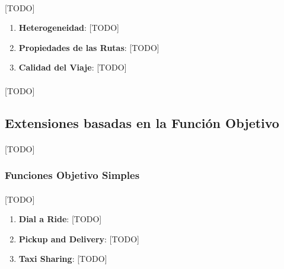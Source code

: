 \documentclass{subfiles}
\begin{document}
        \paragraph{}
        [TODO]

        \begin{enumerate}
          \item \textbf{Heterogeneidad}: [TODO]

          \item \textbf{Propiedades de las Rutas}: [TODO]

          \item \textbf{Calidad del Viaje}: [TODO]

        \end{enumerate}

        \paragraph{}
        [TODO]

      \subsection{Extensiones basadas en la Función Objetivo}
      \label{sec:formulation_extensions_objective_functions}

        \paragraph{}
        [TODO]

        \subsubsection{Funciones Objetivo Simples}
        \label{sec:formulation_extensions_objective_functions_single}

          \paragraph{}
          [TODO]

          \begin{enumerate}

            \item \textbf{Dial a Ride}: [TODO]

            \item \textbf{Pickup and Delivery}: [TODO]

            \item \textbf{Taxi Sharing}: [TODO]

          \end{enumerate}
\end{document}
